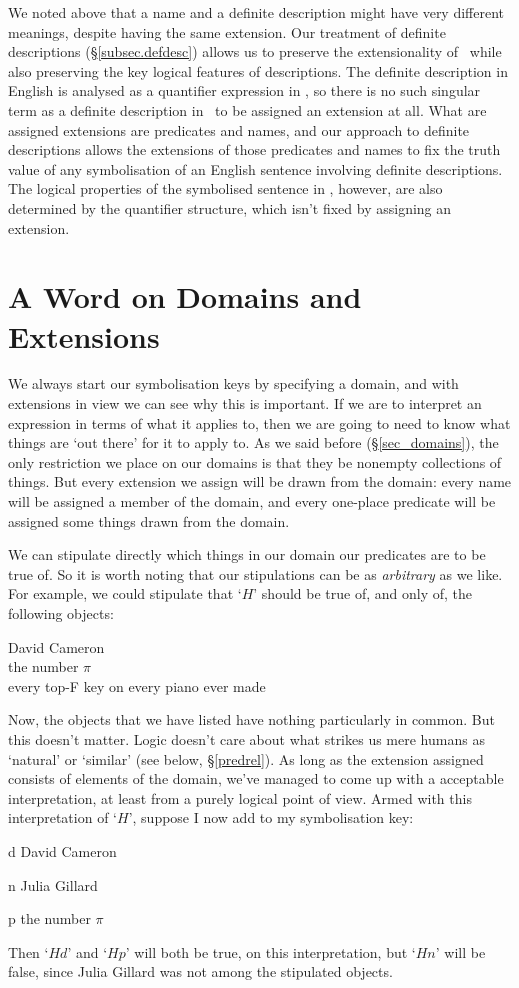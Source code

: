 We noted above that a name and a definite description might have very different meanings, despite having the same extension. Our treatment of definite descriptions (§\ref{subsec.defdesc}) allows us to preserve the extensionality of \FOL\ while also preserving the key logical features of descriptions. The definite description in English is analysed as a quantifier expression in \FOL, so there is no such singular term as a definite description in \FOL\ to be assigned an extension at all. What are assigned extensions are predicates and names, and our approach to definite descriptions allows the extensions of those predicates and names to fix the truth value of any symbolisation of an English sentence involving definite descriptions. The logical properties of the symbolised sentence in \FOL, however, are also determined by the quantifier structure, which isn't fixed by assigning an extension.



\section{A Word on Domains and Extensions}

We always start our symbolisation keys by specifying a domain, and with extensions in view we can see why this is important. If we are to interpret an expression in terms of what it applies to, then we are going to need to know what things are `out there' for it to apply to. As we said before (§\ref{sec_domains}), the only restriction we place on our domains is that they be nonempty collections of things. But every extension we assign will be drawn from the domain: every name will be assigned a member of the domain, and every one-place predicate will be assigned some things drawn from the domain. 

We can stipulate directly which things in our domain our predicates are to be true of. So it is worth noting that our stipulations can be as \emph{arbitrary} as we like. For example, we could stipulate that `$H$' should be true of, and only of, the following objects:
	\begin{center}
		David Cameron\\
		the number $\pi$\\
		every top-F key on every piano ever made
	\end{center}
Now, the objects that we have listed have nothing particularly in common. But this doesn't matter. Logic doesn't care about what strikes us mere humans as `natural' or `similar' (see below, §\ref{predrel}). As long as the extension assigned consists of elements of the domain, we've managed to come up with a acceptable interpretation, at least from a purely logical point of view.  Armed with this interpretation of `$H$', suppose I now add to my symbolisation key:
	\begin{ekey}
		\item[d] David Cameron
		\item[n] Julia Gillard
		\item[p] the number $\pi$
	\end{ekey}
Then `$Hd$' and `$Hp$' will both be true, on this interpretation, but `$Hn$' will be false, since Julia Gillard was not among the stipulated objects. 

